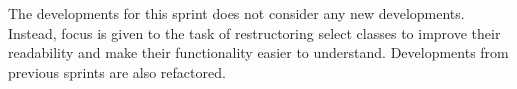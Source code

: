 The developments for this sprint does not consider any new developments.
Instead, focus is given to the task of restructoring select classes to improve their readability and make their functionality easier to understand.
Developments from previous sprints are also refactored.